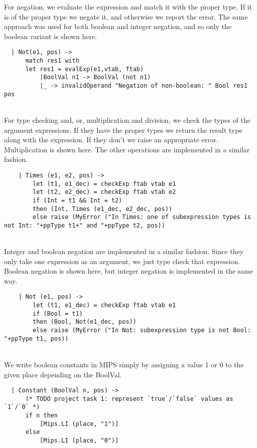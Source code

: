 For negation, we evaluate the expression and match it with the proper type. If it is of the proper type we negate it, and otherwise we report the error. The same approach was used for both boolean and integer negation, and so only the boolean variant is shown here. 
\begin{verbatim}
  | Not(e1, pos) ->
      match res1 with
      let res1 = evalExp(e1,vtab, ftab)
          |BoolVal n1 -> BoolVal (not n1)
          |_ -> invalidOperand "Negation of non-boolean: " Bool res1 pos
\end{verbatim}
~\\

For type checking and, or, multiplication and division, we check the types of the argument expressions. If they have the proper types we return the result type along with the expression. If they don't we raise an appropriate error. Multiplication is shown here. The other operations are implemented in a similar fashion.
\begin{verbatim}
    | Times (e1, e2, pos) ->
        let (t1, e1_dec) = checkExp ftab vtab e1
        let (t2, e2_dec) = checkExp ftab vtab e2
        if (Int = t1 && Int = t2)
        then (Int, Times (e1_dec, e2_dec, pos))
        else raise (MyError ("In Times: one of subexpression types is not Int: "+ppType t1+" and "+ppType t2, pos))
\end{verbatim}
~\\

Integer and boolean negation are implemented in a similar fashion. Since they only take one expression as an argument, we just type check that expression. Boolean negation is shown here, but integer negation is implemented in the same way.
\begin{verbatim}
    | Not (e1, pos) ->
        let (t1, e1_dec) = checkExp ftab vtab e1
        if (Bool = t1) 
        then (Bool, Not(e1_dec, pos))
        else raise (MyError ("In Not: subexpression type is not Bool: "+ppType t1, pos))
\end{verbatim}
~\\

We write boolean constants in MIPS simply by assigning a value 1 or 0 to the given place depending on the BoolVal.
\begin{verbatim}
  | Constant (BoolVal n, pos) ->
      (* TODO project task 1: represent `true`/`false` values as `1`/`0` *)
      if n then
          [Mips.LI (place, "1")]
      else
          [Mips.LI (place, "0")]
\end{verbatim}
~\\

